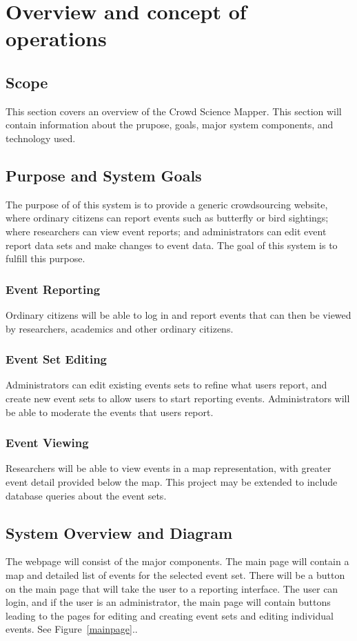 
\chapter{Overview and concept of operations}

\section{Scope}
This section covers an overview of the Crowd Science Mapper. This section will contain information about the prupose, goals, major system components, and technology used.

\section{Purpose and System Goals}
The purpose of of this system is to provide a generic crowdsourcing website, where ordinary citizens can report events such as butterfly or bird sightings; where researchers can view event reports; and administrators can edit event report data sets and make changes to event data.  The goal of this system is to fulfill this purpose.

\subsection{Event Reporting}
Ordinary citizens will be able to log in and report events that can then be viewed by researchers, academics and other ordinary citizens. 

\subsection{Event Set Editing}
Administrators can edit existing events sets to refine what users report, and create new event sets to allow users to start reporting events.  Administrators will be able to moderate the events that users report.

\subsection{Event Viewing}
Researchers will be able to view events in a map representation, with greater event detail provided below the map. This project may be extended to include database queries about the event sets.

\section{System Overview and Diagram}
The webpage will consist of the major components. The main page will contain a map and detailed list of events for the selected event set. There will be a button on the main page that will take the user to a reporting interface. The user can login, and if the user is an administrator, the main page will contain buttons leading to the pages for editing and creating event sets and editing individual events. See Figure~\ref{mainpage}..

